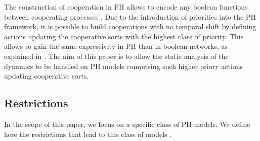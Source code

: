 The construction of cooperation in PH allows to encode any boolean functions between cooperating processes \cite{PMR10-TCSB}.
Due to the introduction of priorities into the PH framework,
it is possible to build cooperations with no temporal shift by defining actions updating the cooperative sorts with the highest class of priority.
This allows to gain the same expressivity in PH than in boolean networks, as explained in .
The aim of this paper is to allow the static analysis of the dynamics to be handled on PH models comprising such higher priory actions updating cooperative sorts.

\begin{comment}
\begin{example}
The PH in \pref{fig:runningPH-2} results from the refinement of the PH in \pref{fig:runningPH-1}
where several cooperations have been specified.
In particular, the bounce to $a_2$ is the result of a cooperation between $b_1$ and $c_1$; and the
bounce to $a_0$ of a cooperation between $b_0$ and $c_0$.
Hence, this PH expresses a BRN where $a$ requires both $b$ and $c$ active to reach its
highest level, and $a$ does not become inactive unless both $b$ and $c$ are inactive.
\end{example}
\end{comment}



\subsection{Restrictions} 
\label{ssec:hypothesis}

In the scope of this paper, we focus on a specific class of PH models.
We define here the restrictions that lead to this class of models .

